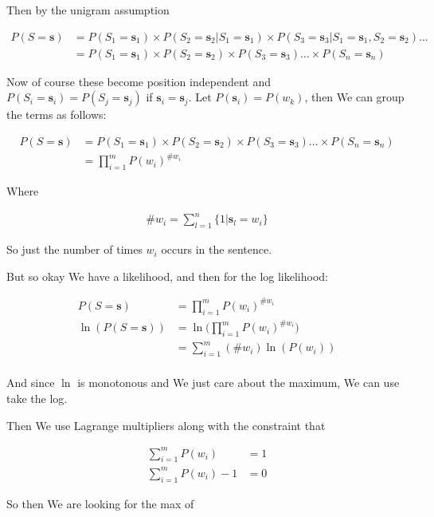 \documentclass{article}
\begin{document}
		Then by the unigram assumption
		
		\begin{align}
			P(S=\mathbf{s}) &= P(S_1=\mathbf{s}_1)\times P(S_2=\mathbf{s}_2 | S_1=\mathbf{s}_1) \times P(S_3=\mathbf{s}_3 | S_1=\mathbf{s}_1, S_2=\mathbf{s}_2)...\\
			&= P(S_1=\mathbf{s}_1)\times P(S_2=\mathbf{s}_2)\times P(S_3=\mathbf{s}_3)\ldots \times P(S_n=\mathbf{s}_n)
		\end{align}
		
		Now of course these become position independent and $P(S_i=\mathbf{s}_i) = P(S_j=\mathbf{s}_j)$ if $\mathbf{s}_i = \mathbf{s}_j$. Let $P(\mathbf{s}_i) = P(w_k)$, then We can group the terms as follows:
		
		\begin{align}
			P(S=\mathbf{s}) &= P(S_1=\mathbf{s}_1)\times P(S_2=\mathbf{s}_2)\times P(S_3=\mathbf{s}_3)\ldots \times P(S_n=\mathbf{s}_n)\\
			&= \prod^m_{i=1} P(w_i)^{\#w_i}
		\end{align}
			
		Where
		
		\begin{align}
			\# w_i = \sum^n_{l = 1} \{1|\mathbf{s}_l = w_i \}
		\end{align}
		
		So just the number of times $w_i$ occurs in the sentence.
		
		But so okay We have a likelihood, and then for the log likelihood:
		
		\begin{align}
			P(S=\mathbf{s}) &= \prod^m_{i=1} P(w_i)^{\#w_i}\\
			\ln(P(S=\mathbf{s})) &= \ln\bigg(\prod^m_{i=1} P(w_i)^{\#w_i}\bigg)\\
			&= \sum^m_{i=1} (\#w_i)\ln (P(w_i))\\
		\end{align}
		
		And since $\ln$ is monotonous and We just care about the maximum, We can use take the log.
		
		Then We use Lagrange multipliers along with the constraint that 
		
		\begin{align}
			\sum^m_{i=1} P(w_i) &= 1\\
			\sum^m_{i=1} P(w_i)-1 &= 0
		\end{align}
		
		So then We are looking for the max of 
		
\end{document}
